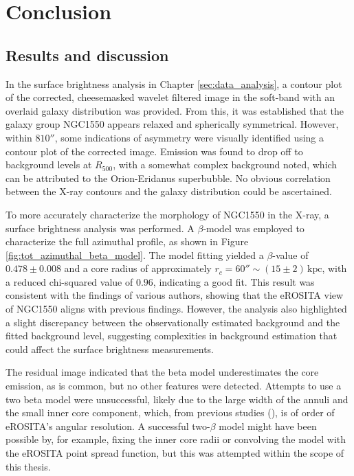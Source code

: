 
\chapter{Conclusion}
\label{sec:conclusion}
\section{Results and discussion}
In the surface brightness analysis in Chapter \ref{sec:data_analysis}, a contour plot of the corrected, cheesemasked wavelet filtered image in the soft-band with an overlaid galaxy distribution was provided. From this, it was established that the galaxy group NGC1550 appears relaxed and spherically symmetrical. However, within \(810''\), some indications of asymmetry were visually identified using a contour plot of the corrected image. Emission was found to drop off to background levels at \(R_{500}\), with a somewhat complex background noted, which can be attributed to the Orion-Eridanus superbubble. No obvious correlation between the X-ray contours and the galaxy distribution could be ascertained.

To more accurately characterize the morphology of NGC1550 in the X-ray, a surface brightness analysis was performed. A \(\beta\)-model was employed to characterize the full azimuthal profile, as shown in Figure \ref{fig:tot_azimuthal_beta_model}. The model fitting yielded a \(\beta\)-value of \(0.478 \pm 0.008\) and a core radius of approximately \(r_c = 60'' \sim (15\pm2)\,\text{kpc}\), with a reduced chi-squared value of \(0.96\), indicating a good fit. This result was consistent with the findings of various authors, showing that the eROSITA view of NGC1550 aligns with previous findings. However, the analysis also highlighted a slight discrepancy between the observationally estimated background and the fitted background level, suggesting complexities in background estimation that could affect the surface brightness measurements.

The residual image indicated that the beta model underestimates the core emission, as is common, but no other features were detected. Attempts to use a two beta model were unsuccessful, likely due to the large width of the annuli and the small inner core component, which, from previous studies (\cite{Kawaharada_2009}), is of order of eROSITA's angular resolution. A successful two-\(\beta\) model might have been possible by, for example, fixing the inner core radii or convolving the model with the eROSITA point spread function, but this was attempted within the scope of this thesis.

